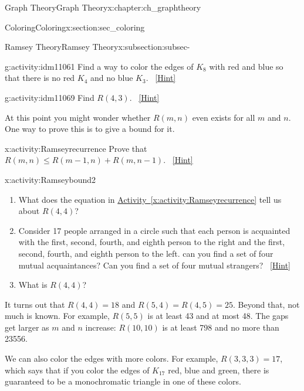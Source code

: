 \documentclass[oneside,10pt,]{book}
\numberwithin{equation}{chapter}
\begin{document}
\begin{chapterptx}{Graph Theory}{}{Graph Theory}{}{}{x:chapter:ch_graphtheory}
\begin{sectionptx}{Coloring}{}{Coloring}{}{}{x:section:sec_coloring}
\begin{subsectionptx}{Ramsey Theory}{}{Ramsey Theory}{}{}{x:subsection:subsec-}
\begin{activity}{}{g:activity:idm11061}
Find a way to color the edges of \(K_8\) with red and blue so that there is no red \(K_4\) and no blue \(K_3\).%
\qquad~\hfill{\tiny\hyperlink{g:hint:idm11067-back}{[Hint]}}\end{activity}
\begin{activity}{}{g:activity:idm11069}%
Find \(R(4,3)\).%
\qquad~\hfill{\tiny\hyperlink{g:hint:idm11073-back}{[Hint]}}\end{activity}
At this point you might wonder whether \(R(m,n)\) even exists for all \(m\) and \(n\).  One way to prove this is to give a bound for it.%
\begin{activity}{}{x:activity:Ramseyrecurrence}%
Prove that \(R(m,n)\le R(m-1,n) + R(m,n-1)\).%
\qquad~\hfill{\tiny\hyperlink{g:hint:idm11088-back}{[Hint]}}\end{activity}
\begin{activity}{}{x:activity:Ramseybound2}%
\begin{enumerate}[font=\bfseries,label=(\alph*),ref=\alph*]
\item{}What does the equation in \hyperref[x:activity:Ramseyrecurrence]{Activity~\ref{x:activity:Ramseyrecurrence}} tell us about \(R(4,4)\)?%
\item{}Consider 17 people arranged in a circle such that each person is acquainted with the first, second, fourth, and eighth person to the right and the first, second, fourth, and eighth person to the left.  can you find a set of four mutual acquaintances?  Can you find a set of four mutual strangers?%
\qquad~\hfill{\tiny\hyperlink{g:hint:idm11132-back}{[Hint]}}\item{}What is \(R(4,4)\)?%
\end{enumerate}
\end{activity}
It turns out that \(R(4,4) = 18\) and \(R(5, 4) = R(4,5) = 25\).  Beyond that, not much is known.  For example, \(R(5,5)\) is at least 43 and at most 48.  The gaps get larger as \(m\) and \(n\) increase: \(R(10,10)\) is at least 798 and no more than 23556.%
\par
We can also color the edges with more colors.  For example, \(R(3,3,3) = 17\), which says that if you color the edges of \(K_{17}\) red, blue and green, there is guaranteed to be a monochromatic triangle in one of these colors.%
\end{subsectionptx}
\end{sectionptx}
%
%
\typeout{************************************************}
\typeout{************************************************}

\end{chapterptx}
\end{document}
